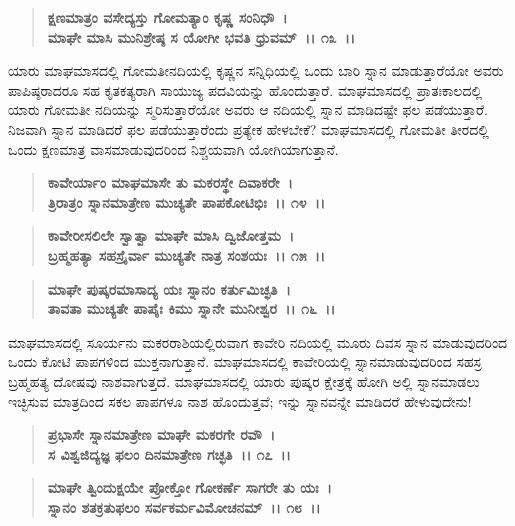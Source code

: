 \begin{verse}
\textbf{ಕ್ಷಣಮಾತ್ರಂ ವಸೇದ್ಯಸ್ತು ಗೋಮತ್ಯಾಂ ಕೃಷ್ಣ ಸಂನಿಧೌ~।}\\\textbf{ಮಾಘೇ ಮಾಸಿ ಮುನಿಶ್ರೇಷ್ಠ ಸ ಯೋಗೀ ಭವತಿ ಧ್ರುವಮ್~।। ೧೩~।।}
\end{verse}

ಯಾರು ಮಾಘಮಾಸದಲ್ಲಿ ಗೋಮತೀನದಿಯಲ್ಲಿ ಕೃಷ್ಣನ ಸನ್ನಿಧಿಯಲ್ಲಿ ಒಂದು ಬಾರಿ ಸ್ನಾನ ಮಾಡುತ್ತಾರೆಯೋ ಅವರು ಪಾಪಿಷ್ಠರಾದರೂ ಸಹ ಕೃತಕತ್ಯರಾಗಿ ಸಾಯುಜ್ಯ ಪದವಿಯನ್ನು ಹೊಂದುತ್ತಾರೆ. ಮಾಘಮಾಸದಲ್ಲಿ ಪ್ರಾತಃಕಾಲದಲ್ಲಿ ಯಾರು ಗೋಮತೀ ನದಿಯನ್ನು ಸ್ಮರಿಸುತ್ತಾರೆಯೋ ಅವರು ಆ ನದಿಯಲ್ಲಿ ಸ್ನಾನ ಮಾಡಿದಷ್ಟೇ ಫಲ ಪಡೆಯುತ್ತಾರೆ. ನಿಜವಾಗಿ ಸ್ನಾನ ಮಾಡಿದರೆ ಫಲ ಪಡೆಯುತ್ತಾರೆಂದು ಪ್ರತ್ಯೇಕ ಹೇಳಬೇಕೆ? ಮಾಘಮಾಸದಲ್ಲಿ ಗೋಮತೀ ತೀರದಲ್ಲಿ ಒಂದು ಕ್ಷಣಮಾತ್ರ ವಾಸಮಾಡುವುದರಿಂದ ನಿಶ್ಚಯವಾಗಿ ಯೋಗಿಯಾಗುತ್ತಾನೆ.

\begin{verse}
\textbf{ಕಾವೇರ್ಯಾಂ ಮಾಘಮಾಸೇ ತು ಮಕರಸ್ಥೇ ದಿವಾಕರೇ~।}\\\textbf{ತ್ರಿರಾತ್ರಂ ಸ್ನಾನಮಾತ್ರೇಣ ಮುಚ್ಯತೇ ಪಾಪಕೋಟಿಭಿಃ~।। ೧೪~।। }
\end{verse}

\begin{verse}
\textbf{ಕಾವೇರೀಸಲಿಲೇ ಸ್ವಾತ್ವಾ ಮಾಘೇ ಮಾಸಿ ದ್ವಿಜೋತ್ತಮ~।}\\\textbf{ಬ್ರಹ್ಮಹತ್ಯಾ ಸಹಸ್ರೈರ್ವಾ ಮುಚ್ಯತೇ ನಾತ್ರ ಸಂಶಯಃ~।। ೧೫~।।} 
\end{verse}

\begin{verse}
\textbf{ಮಾಘೇ ಪುಷ್ಕರಮಾಸಾದ್ಯ ಯಃ ಸ್ನಾನಂ ಕರ್ತುಮಿಚ್ಛತಿ~।}\\\textbf{ತಾವತಾ ಮುಚ್ಯತೇ ಪಾಪೈಃ ಕಿಮು ಸ್ನಾನೇ ಮುನೀಶ್ವರ~।। ೧೬~।।}
\end{verse}

ಮಾಘಮಾಸದಲ್ಲಿ ಸೂರ್ಯನು ಮಕರರಾಶಿಯಲ್ಲಿರುವಾಗ ಕಾವೇರಿ ನದಿಯಲ್ಲಿ ಮೂರು ದಿವಸ ಸ್ನಾನ ಮಾಡುವುದರಿಂದ ಒಂದು ಕೋಟಿ ಪಾಪಗಳಿಂದ ಮುಕ್ತನಾಗುತ್ತಾನೆ. ಮಾಘಮಾಸದಲ್ಲಿ ಕಾವೇರಿಯಲ್ಲಿ ಸ್ನಾನಮಾಡುವುದರಿಂದ ಸಹಸ್ರ ಬ್ರಹ್ಮಹತ್ಯ ದೋಷವು ನಾಶವಾಗುತ್ತದೆ. ಮಾಘಮಾಸದಲ್ಲಿ ಯಾರು ಪುಷ್ಕರ ಕ್ಷೇತ್ರಕ್ಕೆ ಹೋಗಿ ಅಲ್ಲಿ ಸ್ನಾನಮಾಡಲು ಇಚ್ಛಿಸುವ ಮಾತ್ರದಿಂದ ಸಕಲ ಪಾಪಗಳೂ ನಾಶ ಹೊಂದುತ್ತವೆ; ಇನ್ನು ಸ್ನಾನವನ್ನೇ ಮಾಡಿದರೆ ಹೇಳುವುದೇನು!

\begin{verse}
\textbf{ಪ್ರಭಾಸೇ ಸ್ನಾನಮಾತ್ರೇಣ ಮಾಘೇ ಮಕರಗೇ ರವೌ~।}\\\textbf{ಸ ವಿಶ್ವಜಿದ್ಯಜ್ಞ ಫಲಂ ದಿನಮಾತ್ರೇಣ ಗಚ್ಛತಿ~।। ೧೭~।। }
\end{verse}

\begin{verse}
\textbf{ಮಾಘೇ ತ್ವಿಂದುಕ್ಷಯೇ ಪ್ರೋಕ್ತೋ ಗೋಕರ್ಣೆ ಸಾಗರೇ ತು ಯಃ~।}\\\textbf{ಸ್ನಾನಂ ಶತಕ್ರತುಫಲಂ ಸರ್ವಕರ್ಮವಿಮೋಚನಮ್~।। ೧೮~।। }
\end{verse}

